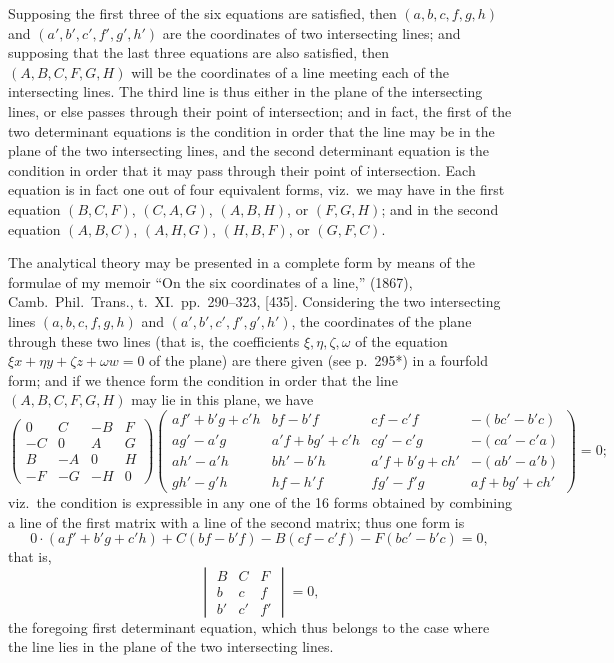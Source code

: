 \documentclass[11pt,a4paper]{book}
\begin{document}
Supposing the first three of the six equations are satisfied, then $(a, b, c, f, g, h)$ and $(a', b', c', f', g', h')$ are the coordinates of two intersecting lines; and supposing that the last three equations are also satisfied, then $(A, B, C, F, G, H)$ will be the coordinates of a line meeting each of the intersecting lines. The third line is thus either in the plane of the intersecting lines, or else passes through their point of intersection; and in fact, the first of the two determinant equations is the condition in order that the line may be in the plane of the two intersecting lines, and the second determinant equation is the condition in order that it may pass through their point of intersection. Each equation is in fact one out of four equivalent forms, viz.\ we may have in the first equation $(B, C, F)$, $(C, A, G)$, $(A, B, H)$, or $(F, G, H)$; and in the second equation $(A, B, C)$, $(A, H, G)$, $(H, B, F)$, or $(G, F, C)$.

The analytical theory may be presented in a complete form by means of the formulae of my memoir ``On the six coordinates of a line,'' (1867), Camb.\ Phil.\ Trans., t.\ XI.\ pp.\ 290--323, [435]. Considering the two intersecting lines $(a, b, c, f, g, h)$ and $(a', b', c', f', g', h')$, the coordinates of the plane through these two lines (that is, the coefficients $\xi, \eta, \zeta, \omega$ of the equation $\xi x + \eta y + \zeta z + \omega w = 0$ of the plane) are there given (see p.\ 295*) in a fourfold form; and if we thence form the condition in order that the line $(A, B, C, F, G, H)$ may lie in this plane, we have
$$
\begin{pmatrix}
0 & C & -B & F \\
-C & 0 & A & G \\
B & -A & 0 & H \\
-F & -G & -H & 0
\end{pmatrix}
\begin{pmatrix}
af' + b'g + c'h & bf - b'f & cf - c'f & -(bc' - b'c) \\
ag' - a'g & a'f + bg' + c'h & cg' - c'g & -(ca' - c'a) \\
ah' - a'h & bh' - b'h & a'f + b'g + ch' & -(ab' - a'b) \\
gh' - g'h & hf - h'f & fg' - f'g & af + bg' + ch'
\end{pmatrix}
= 0;
$$
viz.\ the condition is expressible in any one of the 16 forms obtained by combining a line of the first matrix with a line of the second matrix; thus one form is
$$
0 \cdot (af' + b'g + c'h) + C(bf - b'f) - B(cf - c'f) - F(bc' - b'c) = 0,
$$
that is,
$$
\begin{vmatrix} B & C & F \\ b & c & f \\ b' & c' & f' \end{vmatrix} = 0,
$$
the foregoing first determinant equation, which thus belongs to the case where the line lies in the plane of the two intersecting lines.
\end{document}
